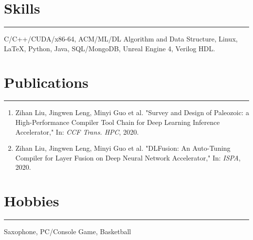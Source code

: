 \documentclass[twocolumn, 9pt]{article}
\begin{document}
		\section*{{\EBITC Skills}\vspace{-1.2em}}
		\noindent
		\rule[0.01em]{\linewidth}{0.01em}
		C/C++/CUDA/x86-64, ACM/ML/DL Algorithm and Data Structure, Linux, \LaTeX, Python, Java, SQL/MongoDB, Unreal Engine 4, Verilog HDL.

		\section*{{\EBITC Publications}\vspace{-1.2em}}
		\noindent
		\rule[0.01em]{\linewidth}{0.01em}
		\begin{enumerate}
		\item Zihan Liu, Jingwen Leng, Minyi Guo et al. "Survey and Design of Paleozoic: a High-Performance Compiler Tool Chain for Deep Learning Inference Accelerator," In: \emph{CCF Trans. HPC}, 2020.
		\item Zihan Liu, Jingwen Leng, Minyi Guo et al. "DLFusion: An Auto-Tuning Compiler for Layer Fusion on Deep Neural Network Accelerator," In: \emph{ISPA}, 2020.
		\end{enumerate}

		\section*{{\EBITC Hobbies}\vspace{-1.2em}}
		\noindent
		\rule[0.01em]{\linewidth}{0.01em}
		Saxophone, PC/Console Game, Basketball
	
\end{document}
